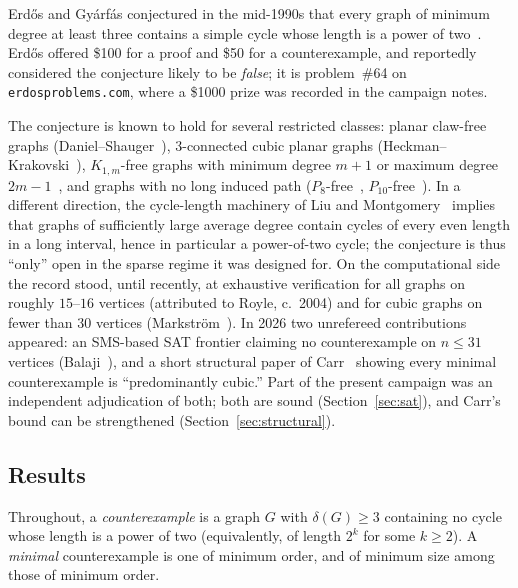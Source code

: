 \documentclass[11pt]{article}
\theoremstyle{remark}
\begin{document}
Erd\H{o}s and Gy\'arf\'as conjectured in the mid-1990s that every graph of
minimum degree at least three contains a simple cycle whose length is a power
of two~\cite{EG95}. Erd\H{o}s offered \$100 for a proof and \$50 for a
counterexample, and reportedly considered the conjecture likely to be
\emph{false}; it is problem~\#64 on \texttt{erdosproblems.com}, where a
\$1000 prize was recorded in the campaign notes.

The conjecture is known to hold for several restricted classes: planar
claw-free graphs (Daniel--Shauger~\cite{DS01}), $3$-connected cubic planar
graphs (Heckman--Krakovski~\cite{HK13}), $K_{1,m}$-free graphs with minimum
degree $m{+}1$ or maximum degree $2m{-}1$~\cite{Shauger98}, and graphs with
no long induced path ($P_8$-free~\cite{P8free}, $P_{10}$-free~\cite{P10free}).
In a different direction, the cycle-length machinery of Liu and
Montgomery~\cite{LM23} implies that graphs of sufficiently large average
degree contain cycles of every even length in a long interval, hence in
particular a power-of-two cycle; the conjecture is thus ``only'' open in the
sparse regime it was designed for. On the computational side the record
stood, until recently, at exhaustive verification for all graphs on roughly
$15$--$16$ vertices (attributed to Royle, c.~2004) and for cubic graphs on
fewer than $30$ vertices (Markstr\"om~\cite{Markstrom04}). In 2026 two
unrefereed contributions appeared: an SMS-based SAT frontier claiming no
counterexample on $n \le 31$ vertices (Balaji~\cite{Balaji26}), and a short
structural paper of Carr~\cite{Carr26} showing every minimal counterexample
is ``predominantly cubic.'' Part of the present campaign was an independent
adjudication of both; both are sound (Section~\ref{sec:sat}), and Carr's
bound can be strengthened (Section~\ref{sec:structural}).

\subsection{Results}

Throughout, a \emph{counterexample} is a graph $G$ with $\delta(G)\ge 3$
containing no cycle whose length is a power of two (equivalently, of length
$2^k$ for some $k \ge 2$). A \emph{minimal}
counterexample is one of minimum order, and of minimum size among those of
minimum order.
\end{document}
